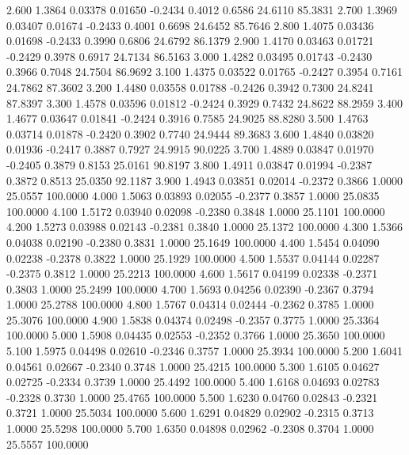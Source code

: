    2.600   1.3864   0.03378   0.01650  -0.2434   0.4012   0.6586  24.6110  85.3831
   2.700   1.3969   0.03407   0.01674  -0.2433   0.4001   0.6698  24.6452  85.7646
   2.800   1.4075   0.03436   0.01698  -0.2433   0.3990   0.6806  24.6792  86.1379
   2.900   1.4170   0.03463   0.01721  -0.2429   0.3978   0.6917  24.7134  86.5163
   3.000   1.4282   0.03495   0.01743  -0.2430   0.3966   0.7048  24.7504  86.9692
   3.100   1.4375   0.03522   0.01765  -0.2427   0.3954   0.7161  24.7862  87.3602
   3.200   1.4480   0.03558   0.01788  -0.2426   0.3942   0.7300  24.8241  87.8397
   3.300   1.4578   0.03596   0.01812  -0.2424   0.3929   0.7432  24.8622  88.2959
   3.400   1.4677   0.03647   0.01841  -0.2424   0.3916   0.7585  24.9025  88.8280
   3.500   1.4763   0.03714   0.01878  -0.2420   0.3902   0.7740  24.9444  89.3683
   3.600   1.4840   0.03820   0.01936  -0.2417   0.3887   0.7927  24.9915  90.0225
   3.700   1.4889   0.03847   0.01970  -0.2405   0.3879   0.8153  25.0161  90.8197
   3.800   1.4911   0.03847   0.01994  -0.2387   0.3872   0.8513  25.0350  92.1187
   3.900   1.4943   0.03851   0.02014  -0.2372   0.3866   1.0000  25.0557 100.0000
   4.000   1.5063   0.03893   0.02055  -0.2377   0.3857   1.0000  25.0835 100.0000
   4.100   1.5172   0.03940   0.02098  -0.2380   0.3848   1.0000  25.1101 100.0000
   4.200   1.5273   0.03988   0.02143  -0.2381   0.3840   1.0000  25.1372 100.0000
   4.300   1.5366   0.04038   0.02190  -0.2380   0.3831   1.0000  25.1649 100.0000
   4.400   1.5454   0.04090   0.02238  -0.2378   0.3822   1.0000  25.1929 100.0000
   4.500   1.5537   0.04144   0.02287  -0.2375   0.3812   1.0000  25.2213 100.0000
   4.600   1.5617   0.04199   0.02338  -0.2371   0.3803   1.0000  25.2499 100.0000
   4.700   1.5693   0.04256   0.02390  -0.2367   0.3794   1.0000  25.2788 100.0000
   4.800   1.5767   0.04314   0.02444  -0.2362   0.3785   1.0000  25.3076 100.0000
   4.900   1.5838   0.04374   0.02498  -0.2357   0.3775   1.0000  25.3364 100.0000
   5.000   1.5908   0.04435   0.02553  -0.2352   0.3766   1.0000  25.3650 100.0000
   5.100   1.5975   0.04498   0.02610  -0.2346   0.3757   1.0000  25.3934 100.0000
   5.200   1.6041   0.04561   0.02667  -0.2340   0.3748   1.0000  25.4215 100.0000
   5.300   1.6105   0.04627   0.02725  -0.2334   0.3739   1.0000  25.4492 100.0000
   5.400   1.6168   0.04693   0.02783  -0.2328   0.3730   1.0000  25.4765 100.0000
   5.500   1.6230   0.04760   0.02843  -0.2321   0.3721   1.0000  25.5034 100.0000
   5.600   1.6291   0.04829   0.02902  -0.2315   0.3713   1.0000  25.5298 100.0000
   5.700   1.6350   0.04898   0.02962  -0.2308   0.3704   1.0000  25.5557 100.0000
